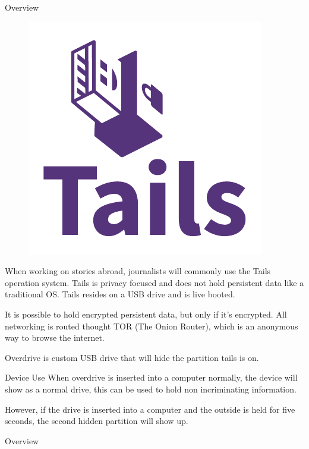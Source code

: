 \documentclass[aspectratio=169]{beamer}
\begin{document}
\begin{frame}{Overview}
    \begin{figure}
        \includegraphics[scale=0.4]{tails.pdf}
    \end{figure}

    When working on stories abroad, journalists will commonly use the Tails
    operation system. Tails is privacy focused and does not hold persistent data
    like a traditional OS. Tails resides on a USB drive and is live booted.

    It is possible to hold encrypted persistent data, but only if it's
    encrypted. All networking is routed thought TOR (The Onion Router), which is
    an anonymous way to browse the internet.

    Overdrive is custom USB drive that will hide the partition tails is on.

\end{frame}


\begin{frame}{Device Use}
When overdrive is inserted into a computer normally, the device will show as a
normal drive, this can be used to hold non incriminating information.

However, if the drive is inserted into a computer and the outside is held for
five seconds, the second hidden partition will show up.

\end{frame}

\begin{frame}{Overview}
\end{frame}
\end{document}
